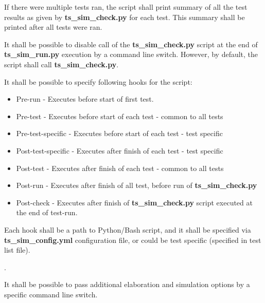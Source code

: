 \documentclass{tropic_design_spec}
\begin{document}

    {If there were multiple tests ran, the script shall print summary of all the test
     results as given by \textbf{ts_sim_check.py} for each test. This summary shall be
     printed after all tests were ran.}


    {It shall be possible to disable call of the \textbf{ts_sim_check.py} script at the
     end of \textbf{ts_sim_run.py} execution by a command line switch. However, by default,
     the script shall call \textbf{ts_sim_check.py}.}


    {It shall be possible to specify following hooks for the script:

\begin{itemize}
    \item{Pre-run            - Executes before start of first test.}
    \item{Pre-test           - Executes before start of each test - common to all tests}
    \item{Pre-test-specific  - Executes before start of each test - test specific}
    \item{Post-test-specific - Executes after finish of each test - test specific}
    \item{Post-test          - Executes after finish of each test - common to all tests}
    \item{Post-run           - Executes after finish of all test, before run of
                               \textbf{ts_sim_check.py}}
    \item{Post-check         - Executes after finish of \textbf{ts_sim_check.py} script
                               executed at the end of test-run.}
\end{itemize}

    Each hook shall be a path to Python/Bash script, and it shall be specified via
    \textbf{ts_sim_config.yml} configuration file, or could be test specific (specified
    in test list file).
}.


    {It shall be possible to pass additional elaboration and simulation options by a
     specific command line switch.}
\end{document}
